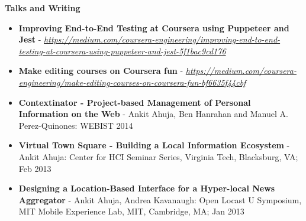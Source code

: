 \documentclass[11pt]{article}
\begin{document}
\vspace{0.1in}

\textbf{Talks and Writing}

\begin{itemize}
	\setlength{\parskip}{2mm}%

	\item
		\textbf{Improving End-to-End Testing at Coursera using Puppeteer and Jest} - \emph{\url{https://medium.com/coursera-engineering/improving-end-to-end-testing-at-coursera-using-puppeteer-and-jest-5f1bac9cd176}}
		
	\item
		\textbf{Make editing courses on Coursera fun} - \emph{\url{https://medium.com/coursera-engineering/make-editing-courses-on-coursera-fun-bf6635f44cbf}}

	\item
		\textbf{Contextinator - Project-based Management of Personal Information
		on the Web} - Ankit Ahuja, Ben Hanrahan and Manuel A. Perez-Quinones: WEBIST 2014

	\item
		\textbf{Virtual Town Square - Building a Local Information Ecosystem} - Ankit Ahuja: Center for HCI Seminar Series, Virginia Tech, Blacksburg, VA; Feb 2013

	\item
		\textbf{Designing a Location-Based Interface for a Hyper-local News Aggregator} - Ankit Ahuja, Andrea Kavanaugh: Open Locast U Symposium, MIT Mobile Experience Lab, MIT, Cambridge, MA; Jan 2013	
\end{itemize}
\end{document}
